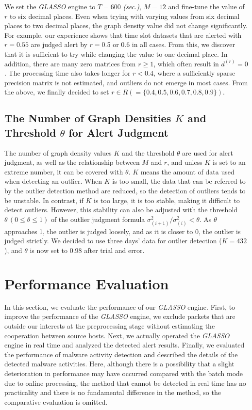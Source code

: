\documentclass[conference]{IEEEtran}
\begin{document}
We set the \textit{GLASSO} engine to $T=600$ \textit{(sec.)}, $M=12$ and fine-tune the value of $r$ to six decimal places.
Even when trying with varying values from six decimal places to two decimal places, the graph density value did not change significantly.
For example, our experience shows that time slot datasets that are alerted with $r=0.55$ are judged alert by $r=$0.5 or 0.6 in all cases.
From this, we discover that it is sufficient to try while changing the value to one decimal place.
In addition, there are many zero matrices from $r\geq 1$, which often result in $d^{(r)}=0$.
The processing time also takes longer for $r < 0.4$, where a sufficiently sparse precision matrix is not estimated, and outliers do not emerge in most cases.
From the above, we finally decided to set $r \in R ( = \{0.4, 0.5, 0.6, 0.7, 0.8, 0.9\})$.



\subsection{The Number of Graph Densities $K$ and Threshold $\theta$ for Alert Judgment}
The number of graph density values $K$ and the threshold $\theta$ are used for alert judgment, as well as the relationship between $M$ and $r$, and unless $K$ is set to an extreme number, it can be covered with $\theta$.
$K$ means the amount of data used when detecting an outlier.
When $K$ is too small, the data that can be referred to by the outlier detection method are reduced, so the detection of outliers tends to be unstable.
In contrast, if $K$ is too large, it is too stable, making it difficult to detect outliers.
However, this stability can also be adjusted with the threshold $\theta \, (0\leq \theta \leq 1)$ of the outlier judgment formula $\sigma^{2}_{(i+1)}/\sigma^{2}_{(i)}<\theta$.
As $\theta$ approaches 1, the outlier is judged loosely, and as it is closer to 0, the outlier is judged strictly.
We decided to use three days' data for outlier detection ($K=432$), and $\theta$ is now set to 0.98 after trial and error.



\section{Performance Evaluation}
In this section, we evaluate the performance of our \textit{GLASSO} engine.
First, to improve the performance of the \textit{GLASSO} engine, we exclude packets that are outside our interests at the preprocessing stage without estimating the cooperation between source hosts.
Next, we actually operated the \textit{GLASSO} engine in real time and analyzed the detected alert results.
Finally, we evaluated the performance of malware activity detection and described the details of the detected malware activities.
Here, although there is a possibility that a slight deterioration in performance may have occurred compared with the batch mode due to online processing, the method that cannot be detected in real time has no practicality and there is no fundamental difference in the method, so the comparative evaluation is omitted.
\end{document}
